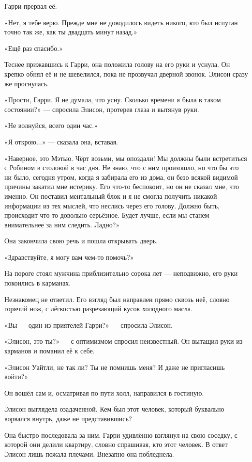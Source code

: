 \documentclass[a5paper, 9pt,
final, openany, twoside=true]{memoir}
\begin{document}
Гарри прервал её:

«Нет, я тебе верю. Прежде мне не доводилось видеть никого, кто был испуган точно так же, как ты двадцать минут назад.»

«Ещё раз спасибо.»

Теснее прижавшись к Гарри, она положила голову на его руки и уснула. Он крепко обнял её и не шевелился, пока не прозвучал дверной звонок. Элисон сразу же проснулась.

«Прости, Гарри. Я не думала, что усну. Сколько времени я была в таком состоянии?» — спросила Элисон, протерев глаза и вытянув руки.

«Не волнуйся, всего один час.»

«Я открою...» — сказала она, вставая.

«Наверное, это Мэтью. Чёрт возьми, мы опоздали! Мы должны были встретиться с Робином в столовой в час дня. Не знаю, что с ним произошло, но что бы это ни было, сегодня утром, когда я забирала его из дома, он безо всякой видимой причины закатил мне истерику. Его что-то беспокоит, но он не сказал мне, что именно. Он поставил ментальный блок и я не смогла получить никакой информации из тех мыслей, что неслись через его голову. Должно быть, происходит что-то довольно серьёзное. Будет лучше, если мы станем внимательнее за ним следить. Ладно?»

Она закончила свою речь и пошла открывать дверь.\bigskip

«Здравствуйте, я могу вам чем-то помочь?»

На пороге стоял мужчина приблизительно сорока лет — неподвижно, его руки покоились в карманах.

Незнакомец не ответил. Его взгляд был направлен прямо сквозь неё, словно горячий нож, с лёгкостью разрезающий кусок холодного масла.

«Вы — один из приятелей Гарри?» — спросила Элисон.

«Элисон, это ты?» — с оптимизмом спросил неизвестный. Он вытащил руки из карманов и поманил её к себе.

«Элисон Уайтли, не так ли? Ты не помнишь меня? И даже не пригласишь войти?»

Он вошёл сам и, осматривая по пути холл, направился в гостиную.

Элисон выглядела озадаченной. Кем был этот человек, который буквально ворвался внутрь, даже не представившись?

Она быстро последовала за ним. Гарри удивлённо взглянул на свою соседку, с которой они делили квартиру, словно спрашивая, кто этот человек. В ответ Элисон лишь пожала плечами. Внезапно она побледнела.
\end{document}
